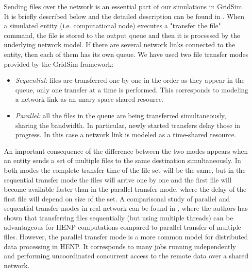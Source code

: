 \documentclass{svjour3}                     %
\begin{document}
Sending files over the network is an essential part of our simulations in GridSim. It is briefly described below and the detailed description can be found in \cite{GridSimNetwork}. When a simulated entity (i.e. computational node) executes a "transfer the file" command, the file is stored to the output queue and then it is processed by the underlying network model. If there are several network links connected to the entity, then each of them has its own queue. We have used two file transfer modes provided by the GridSim framework:
\begin{itemize}
\item \textit{Sequential:} files are transferred one by one in the order as they appear in the queue, only one transfer at a time is performed. This corresponds to modeling a network link as an unary space-shared resource.
\item \textit{Parallel:} all the files in the queue are being transferred simultaneously, sharing the bandwidth.  In particular, newly started transfers delay those in progress. In this case a network link is modeled as a time-shared resource.
\end{itemize}
An important consequence of the difference between the two modes appears when an entity sends a set of multiple files to the same destination simultaneously. In both modes the complete transfer time of the file set will be the same, but in the sequential transfer mode the files will arrive one by one and the first file will become available faster than in the parallel transfer mode, where the delay of the first file will depend on size of the set. A comparisonal study of parallel and sequential transfer modes in real network can be found in \cite{Zerola}, where the authors has shown that transferring files sequentially (but using multiple threads) can be advantageous for HENP computations compared to parallel transfer of multiple files. However, the parallel transfer mode is a more common model for distributed data processing in HENP. It corresponds to many jobs running independently and performing uncoordinated concurrent access to the remote data over a shared network.
\end{document}
